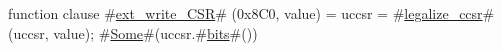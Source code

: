 function clause #\hyperref[sailRISCVzextzywritezyCSR]{ext\_write\_CSR}# (0x8C0, value) = { uccsr = #\hyperref[sailRISCVzlegalizzezyccsr]{legalize\_ccsr}#(uccsr, value); #\hyperref[sailRISCVzSome]{Some}#(uccsr.#\hyperref[sailRISCVzbits]{bits}#()) }
